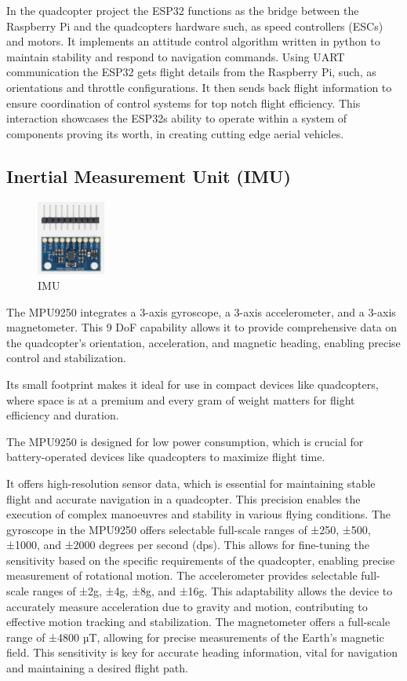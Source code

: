 \documentclass{article}
\begin{document}
In the quadcopter project the ESP32 functions as the bridge between the Raspberry Pi and the quadcopters hardware such, as speed controllers (ESCs) and motors. It implements an attitude control algorithm written in python to maintain stability and respond to navigation commands. Using UART communication the ESP32 gets flight details from the Raspberry Pi, such, as orientations and 
throttle configurations. It then sends back flight information to ensure coordination of control systems for top notch flight efficiency. This interaction showcases the ESP32s ability to operate within a system of components proving its worth, in creating cutting edge aerial vehicles.

\subsection{Inertial Measurement Unit (IMU)}\label{IMU}
\begin{figure}[H]
  \centering
  \includegraphics[width=0.2\textwidth]{Pictures/IMU.png}
  \caption{IMU}
  \label{fig:IMU}
\end{figure}
The MPU9250 integrates a 3-axis gyroscope, a 3-axis accelerometer, and a 3-axis magnetometer. This 9 DoF capability allows it to provide comprehensive data on the quadcopter's orientation, acceleration, and magnetic heading, enabling precise control and stabilization.

Its small footprint makes it ideal for use in compact devices like quadcopters, where space is at a premium and every gram of weight matters for flight efficiency and duration.

The MPU9250 is designed for low power consumption, which is crucial for battery-operated devices like quadcopters to maximize flight time.

It offers high-resolution sensor data, which is essential for maintaining stable flight and accurate navigation in a quadcopter. This precision enables the execution of complex manoeuvres and stability in various flying conditions. The gyroscope in the MPU9250 offers selectable full-scale ranges of ±250, ±500, ±1000, and ±2000 degrees per second (dps). This allows for fine-tuning the 
sensitivity based on the specific requirements of the quadcopter, enabling precise measurement of rotational motion. The accelerometer provides selectable full-scale ranges of ±2g, ±4g, ±8g, and ±16g. This adaptability allows the device to accurately measure acceleration due to gravity and motion, contributing to effective motion tracking and stabilization. The magnetometer offers a 
full-scale range of ±4800 µT, allowing for precise measurements of the Earth's magnetic field. This sensitivity is key for accurate heading information, vital for navigation and maintaining a desired flight path.
\end{document}

